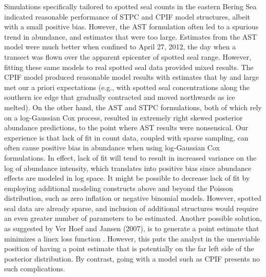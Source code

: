 \documentclass[12pt,english]{article}
\begin{document}
\begin{spacing}{1.9}
Simulations specifically tailored to spotted seal counts in the eastern Bering Sea indicated reasonable performance of STPC and CPIF model structures, albeit with a small positive bias.  However, the AST formulation often led to a spurious trend in abundance, and estimates that were too large.  Estimates from the AST model were much better when confined to April 27, 2012, the day when a transect was flown over the apparent epicenter of spotted seal range.  However, fitting these same models to real spotted seal data provided mixed results.  The CPIF model produced reasonable model results with estimates that by and large met our a priori expectations (e.g., with spotted seal concentrations along the southern ice edge that gradually contracted and moved northwards as ice melted).  On the other hand, the AST and STPC formulations, both of which rely on a log-Gaussian Cox process, resulted in extremely right skewed posterior abundance predictions, to the point where AST results were nonsensical.  Our experience \citep[see e.g.,][]{VerHoefJansen2007,ConnEtAl2014} is that lack of fit in count data, coupled with sparse sampling, can often cause positive bias in abundance when using log-Gaussian Cox formulations.  In effect, lack of fit will tend to result in increased variance on the log of abundance intensity, which translates into positive bias since abundance effects are modeled in log space.  It might be possible to decrease lack of fit by employing additional modeling constructs above and beyond the Poisson distribution, such as zero inflation \citep{AgarwalEtAl2002,VerHoefJansen2007} or negative binomial models.  However, spotted seal data are already sparse, and inclusion of additional structures would require an even greater number of parameters to be estimated. Another possible solution, as suggested by Ver Hoef and Jansen (2007), is to generate a point estimate that minimizes a linex loss function \citep{Varian1975}.  However, this puts the analyst in the unenviable position of having a point estimate that is potentially on the far left side of the posterior distribution.  By contrast, going with a model such as CPIF presents no such complications.


\end{spacing}
\end{document}
